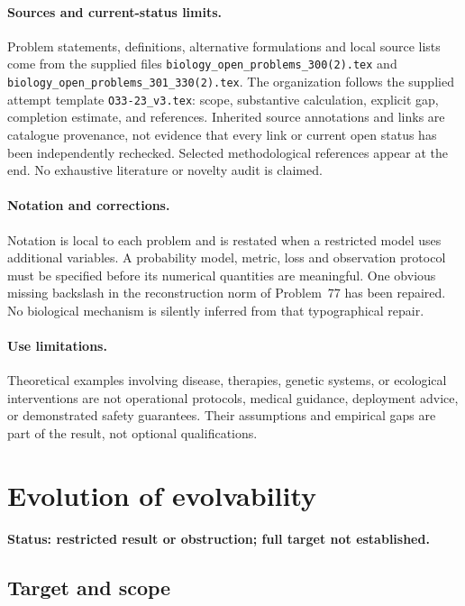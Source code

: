 \documentclass[11pt]{article}
\begin{document}
\paragraph{Sources and current-status limits.}
Problem statements, definitions, alternative formulations and local source lists
come from the supplied files
\texttt{biology\_open\_problems\_300(2).tex} and
\texttt{biology\_open\_problems\_301\_330(2).tex}.
The organization follows the supplied attempt template
\texttt{O33-23\_v3.tex}: scope, substantive calculation, explicit gap,
completion estimate, and references. Inherited source annotations and links are
catalogue provenance, not evidence that every link or current open status has
been independently rechecked. Selected methodological references appear at the
end. No exhaustive literature or novelty audit is claimed.

\paragraph{Notation and corrections.}
Notation is local to each problem and is restated when a restricted model uses
additional variables. A probability model, metric, loss and observation protocol
must be specified before its numerical quantities are meaningful. One obvious
missing backslash in the reconstruction norm of Problem~77 has been repaired.
No biological mechanism is silently inferred from that typographical repair.

\paragraph{Use limitations.}
Theoretical examples involving disease, therapies, genetic systems, or ecological
interventions are not operational protocols, medical guidance, deployment advice,
or demonstrated safety guarantees. Their assumptions and empirical gaps are part
of the result, not optional qualifications.


\section*{Evolution of evolvability}
\label{prob:156}
\noindent\textbf{Status: restricted result or obstruction; full target not established.}
\subsection{Target and scope}
\end{document}
